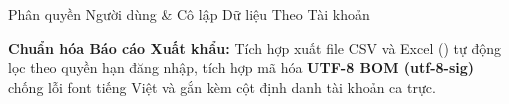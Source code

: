 \documentclass[aspectratio=169, 11pt]{beamer}
\newcommand{\code}[1]{\leavevmode{\ttfamily\color{DarkMain}#1}}
\begin{document}
\begin{frame}{Phân quyền Người dùng \& Cô lập Dữ liệu Theo Tài khoản}
  \vspace{0.10cm}
  \begin{tcolorbox}[
    enhanced, colback=DarkMain, colframe=white, boxrule=1.0pt, arc=3.5pt,
    top=3.5pt, bottom=3.5pt, left=8pt, right=8pt
  ]
    {\fontsize{7.3pt}{9.2pt}\selectfont\color{white}\textbf{Chuẩn hóa Báo cáo Xuất khẩu:} Tích hợp xuất file CSV và Excel (\code{.xlsx}) tự động lọc theo quyền hạn đăng nhập, tích hợp mã hóa \textbf{UTF-8 BOM (utf-8-sig)} chống lỗi font tiếng Việt và gắn kèm cột định danh tài khoản ca trực.}
  \end{tcolorbox}
\end{frame}

\end{document}
